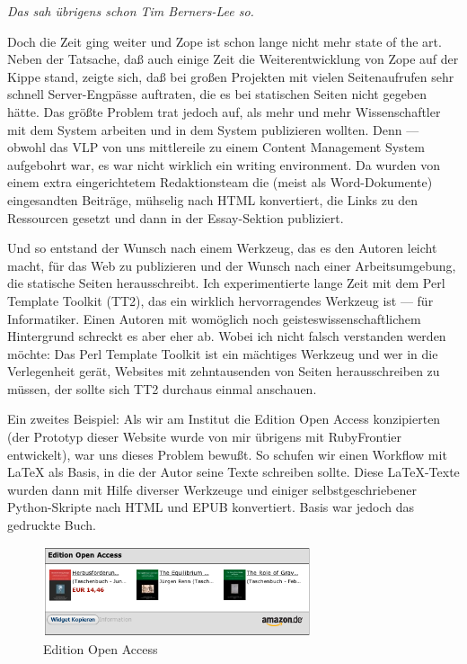 \documentclass[11pt]{report}
\begin{document}
\emph{Das sah übrigens schon Tim Berners-Lee so.}

Doch die Zeit ging weiter und Zope ist schon lange nicht mehr state of
the art. Neben der Tatsache, daß auch einige Zeit die
Weiterentwicklung von Zope auf der Kippe stand, zeigte sich, daß bei
großen Projekten mit vielen Seitenaufrufen sehr schnell
Server-Engpässe auftraten, die es bei statischen Seiten nicht gegeben
hätte. Das größte Problem trat jedoch auf, als mehr und mehr
Wissenschaftler mit dem System arbeiten und in dem System publizieren
wollten. Denn — obwohl das VLP von uns mittlereile zu einem Content
Management System aufgebohrt war, es war nicht wirklich ein writing
environment. Da wurden von einem extra eingerichtetem Redaktionsteam
die (meist als Word-Dokumente) eingesandten Beiträge, mühselig nach
HTML konvertiert, die Links zu den Ressourcen gesetzt und dann in der
Essay-Sektion publiziert.


Und so entstand der Wunsch nach einem Werkzeug, das es den Autoren
leicht macht, für das Web zu publizieren und der Wunsch nach einer
Arbeitsumgebung, die statische Seiten herausschreibt. Ich
experimentierte lange Zeit mit dem Perl Template Toolkit (TT2), das
ein wirklich hervorragendes Werkzeug ist — für Informatiker. Einen
Autoren mit womöglich noch geisteswissenschaftlichem Hintergrund
schreckt es aber eher ab. Wobei ich nicht falsch verstanden werden
möchte: Das Perl Template Toolkit ist ein mächtiges Werkzeug und wer
in die Verlegenheit gerät, Websites mit zehntausenden von Seiten
herausschreiben zu müssen, der sollte sich TT2 durchaus einmal
anschauen.


Ein zweites Beispiel: Als wir am Institut die Edition Open Access
konzipierten (der Prototyp dieser Website wurde von mir übrigens mit
RubyFrontier entwickelt), war uns dieses Problem bewußt. So schufen
wir einen Workflow mit \LaTeX{} als Basis, in die der Autor seine Texte
schreiben sollte. Diese \LaTeX{}-Texte wurden dann mit Hilfe diverser
Werkzeuge und einiger selbstgeschriebener Python-Skripte nach HTML und
EPUB konvertiert. Basis war jedoch das gedruckte Buch.

\begin{figure}[h!]
\centering
\includegraphics[width=0.7\textwidth]{./images/eoa.png}
\caption{\label{eoa}Edition Open Access}
\end{figure}
\end{document}

